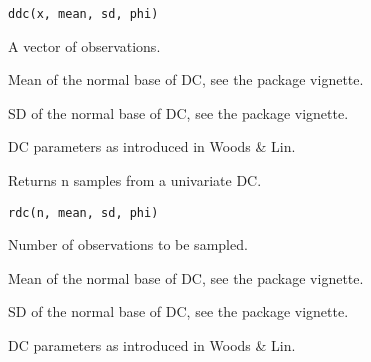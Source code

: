 \documentclass[letterpaper]{book}
\begin{document}
%
\begin{Usage}
\begin{verbatim}
ddc(x, mean, sd, phi)
\end{verbatim}
\end{Usage}
%
\begin{Arguments}
\begin{ldescription}
\item[\code{x}] A vector of observations.

\item[\code{mean}] Mean of the normal base of DC, see the package vignette.

\item[\code{sd}] SD of the normal base of DC, see the package vignette.

\item[\code{phi}] DC parameters as introduced in Woods \& Lin.
\end{ldescription}
\end{Arguments}
%
\begin{Description}\relax
Returns n samples from a univariate DC.
\end{Description}
%
\begin{Usage}
\begin{verbatim}
rdc(n, mean, sd, phi)
\end{verbatim}
\end{Usage}
%
\begin{Arguments}
\begin{ldescription}
\item[\code{n}] Number of observations to be sampled.

\item[\code{mean}] Mean of the normal base of DC, see the package vignette.

\item[\code{sd}] SD of the normal base of DC, see the package vignette.

\item[\code{phi}] DC parameters as introduced in Woods \& Lin.
\end{ldescription}
\end{Arguments}
\printindex{}
\end{document}
